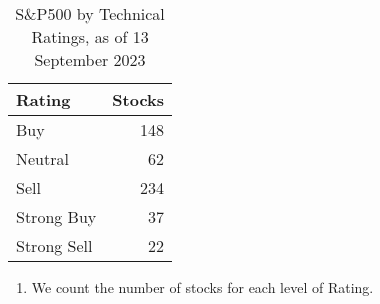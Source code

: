 \documentclass[
  letterpaper,
  DIV=11,
  numbers=noendperiod]{scrreport}
\newenvironment{Shaded}{\begin{snugshade}}{\end{snugshade}}
\newcommand{\AttributeTok}[1]{\textcolor[rgb]{0.40,0.45,0.13}{#1}}
\newcommand{\FunctionTok}[1]{\textcolor[rgb]{0.28,0.35,0.67}{#1}}
\newcommand{\NormalTok}[1]{\textcolor[rgb]{0.00,0.23,0.31}{#1}}
\newcommand{\OtherTok}[1]{\textcolor[rgb]{0.00,0.23,0.31}{#1}}
\newcommand{\SpecialCharTok}[1]{\textcolor[rgb]{0.37,0.37,0.37}{#1}}
\newcommand{\StringTok}[1]{\textcolor[rgb]{0.13,0.47,0.30}{#1}}
\providecommand{\tightlist}{%
  \setlength{\itemsep}{0pt}\setlength{\parskip}{0pt}}\usepackage{longtable,booktabs,array}
\begin{document}
\begin{table}

\caption{S&P500 by Technical Ratings, as of 13 September 2023}
\centering
\begin{tabular}[t]{l|r}
\hline
Rating & Stocks\\
\hline
Buy & 148\\
\hline
Neutral & 62\\
\hline
Sell & 234\\
\hline
Strong Buy & 37\\
\hline
Strong Sell & 22\\
\hline
\end{tabular}
\end{table}

\begin{enumerate}
\def\labelenumi{\arabic{enumi}.}
\setcounter{enumi}{3}
\tightlist
\item
  We count the number of stocks for each level of Rating.
\end{enumerate}

\begin{Shaded}
\end{Shaded}
\end{document}
